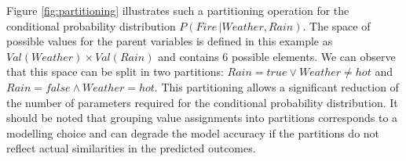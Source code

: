 Figure \ref{fig:partitioning} illustrates such a partitioning operation for the conditional probability distribution $P(\mathit{Fire} \, | \mathit{Weather}, \mathit{Rain})$.  The space of possible values for the parent variables is defined in this example as $\mathit{Val}(\mathit{Weather}) \times \mathit{Val}(\mathit{Rain})$ and contains 6 possible elements.  We can observe that this space can be split in two partitions: $\mathit{Rain}\!=\mathit{true} \lor \mathit{Weather}\!\neq\mathit{hot}$ and $\mathit{Rain}\!=\mathit{false} \land \mathit{Weather}\!=\mathit{hot}$. This partitioning allows a significant reduction of the number of parameters required for the conditional probability distribution.  It should be noted that grouping value assignments into partitions corresponds to a modelling choice and can degrade the model accuracy if the partitions do not reflect actual similarities in the predicted outcomes.



